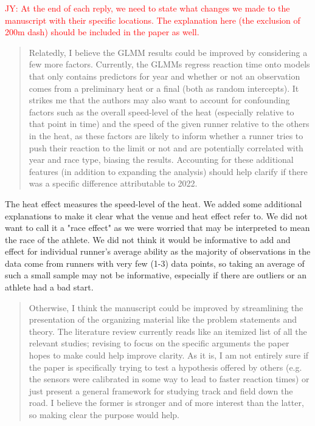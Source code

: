 \documentclass[12pt]{article}
\newcommand{\jy}[1]{\textcolor{red}{JY: #1}}
\newenvironment{comment}%
{\begin{quotation}\noindent\small\it\color{darkblue}\ignorespaces%
}{\end{quotation}}
\begin{document}
\jy{At the end of each reply, we need to state what changes we made to
  the manuscript with their specific locations. The explanation here
  (the exclusion of 200m dash) should be included in the paper as well.}

\begin{comment}
Relatedly, I believe the GLMM results could be improved by considering a few
more factors. Currently, the GLMMs regress reaction time onto models that only
contains predictors for year and whether or not an observation comes from a
preliminary heat or a final (both as random intercepts). It strikes me that the
authors may also want to account for confounding factors such as the overall
speed-level of the heat (especially relative to that point in time) and the
speed of the given runner relative to the others in the heat, as these factors
are likely to inform whether a runner tries to push their reaction to the limit
or not and are potentially correlated with year and race type, biasing the
results. Accounting for these additional features (in addition to expanding the
analysis) should help clarify if there was a specific difference attributable to
2022.
\end{comment} 


The heat effect measures the speed-level of the heat.  We added some additional
explanations to make it clear what the venue and heat effect refer to. We did
not want to call it a "race effect" as we were worried that may be interpreted
to mean the race of the athlete.  We did not think it would be informative to 
add and effect for individual runner's average ability as the majority of
observations in the data come from runners with very few (1-3) data points,
so taking an average of such a small sample may not be informative, especially
if there are outliers or an athlete had a bad start.


\begin{comment}
Otherwise, I think the manuscript could be improved by streamlining the
presentation of the organizing material like the problem statements and theory.
The literature review currently reads like an itemized list of all the relevant
studies; revising to focus on the specific arguments the paper hopes to make
could help improve clarity. As it is, I am not entirely sure if the paper is
specifically trying to test a hypothesis offered by others (e.g. the sensors
were calibrated in some way to lead to faster reaction times) or just present a
general framework for studying track and field down the road. I believe the
former is stronger and of more interest than the latter, so making clear the
purpose would help.
\end{comment}  
\end{document}
